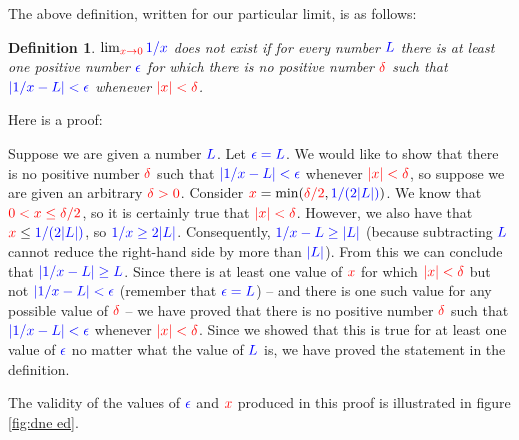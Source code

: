 \documentclass{myarticle}
\newcommand{\hor}[1]{\textcolor{red}{#1}}
\newcommand{\ver}[1]{\textcolor{blue}{#1}}
\theoremstyle{nospace}
\newtheorem*{oldattempt}{Definition}
\newenvironment{attempt}
{\begin{mdframed}\begin{oldattempt}}
    {\end{oldattempt}\end{mdframed}}
\newtheorem{old series theorem}{Theorem}
\newenvironment{series theorem}
{\begin{mdframed}\begin{old series theorem}}
    {\end{old series theorem}\end{mdframed}}
\begin{document}
The above definition, written for our particular limit, is as follows:

\begin{attempt}
  $\lim_{\hor{x \to 0}} \ver{1/x}$ does not exist if for every number
  $\ver{L}$ there is at least one positive number $\ver{\epsilon}$ for
  which there is no positive number $\hor{\delta}$ such that
  $\ver{|1/x - L| < \epsilon}$ whenever $\hor{|x| < \delta}$.
\end{attempt}

Here is a proof:

\begin{mdframed}
  Suppose we are given a number $\ver{L}$. Let $\ver{\epsilon = L}$.
  We would like to show that there is no positive number
  $\hor{\delta}$ such that $\ver{|1/x - L| < \epsilon}$ whenever
  $\hor{|x| < \delta}$, so suppose we are given an arbitrary
  $\hor{\delta > 0}$. Consider
  $\hor{x} = \min(\hor{\delta/2}, \ver{1/(2|L|)})$. We know that
  $\hor{0 < x \leq \delta/2}$, so it is certainly true that
  $\hor{|x| < \delta}$. However, we also have that
  $\hor{x} \leq \ver{1/(2|L|)}$, so $\ver{1/x \geq 2|L|}$.
  Consequently, $\ver{1/x - L \geq |L|}$ (because subtracting
  $\ver{L}$ cannot reduce the right-hand side by more than
  $\ver{|L|}$). From this we can conclude that
  $\ver{|1/x - L| \geq L}$. Since there is at least one value of
  $\hor{x}$ for which $\hor{|x| < \delta}$ but not
  $\ver{|1/x - L| < \epsilon}$ (remember that $\ver{\epsilon = L}$) --
  and there is one such value for any possible value of $\hor{\delta}$
  -- we have proved that there is no positive number $\hor{\delta}$
  such that $\ver{|1/x - L| < \epsilon}$ whenever
  $\hor{|x| < \delta}$. Since we showed that this is true for at least
  one value of $\ver{\epsilon}$ no matter what the value of $\ver{L}$
  is, we have proved the statement in the definition.
\end{mdframed}

The validity of the values of $\ver{\epsilon}$ and $\hor{x}$ produced
in this proof is illustrated in figure \ref{fig:dne ed}.
\end{document}
